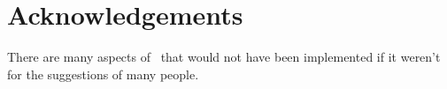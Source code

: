 \section{Acknowledgements}

There are many aspects of \alis\ that would not have been implemented
if it weren't for the suggestions of many people.
